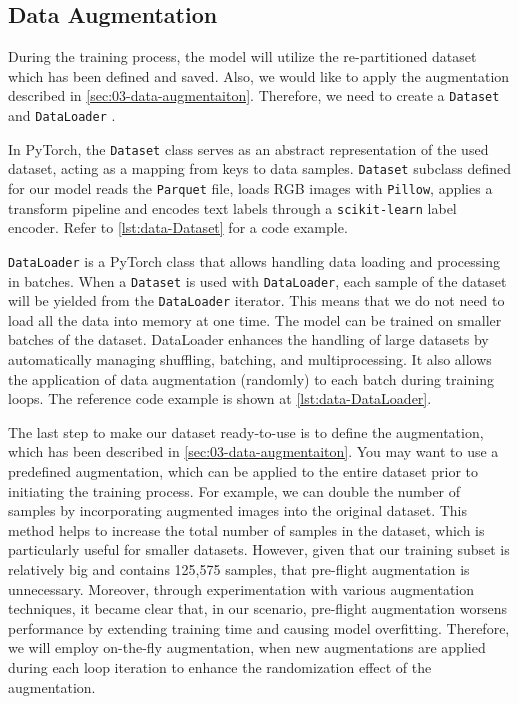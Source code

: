 \subsection*{Data Augmentation}

During the training process, the model will utilize the re-partitioned dataset which has been defined and saved. Also, we would like to apply the augmentation described in \autoref{sec:03-data-augmentaiton}. Therefore, we need to create a \texttt{Dataset} and \texttt{DataLoader} \cite{siddiqui2025mastering}. 

In PyTorch, the \texttt{Dataset} class serves as an abstract representation of the used dataset, acting as a mapping from keys to data samples. \texttt{Dataset} subclass defined for our model reads the \texttt{Parquet} file, loads RGB images with \texttt{Pillow},  applies a transform pipeline and encodes text labels through a \texttt{scikit‑learn} label encoder. Refer to \autoref{lst:data-Dataset} for a code example.

\texttt{DataLoader} is a PyTorch class that allows handling data loading and processing in batches. When a \texttt{Dataset} is used with \texttt{DataLoader}, each sample of the dataset will be yielded from the \texttt{DataLoader} iterator. This means that we do not need to load all the data into memory at one time. The model can be trained on smaller batches of the dataset. DataLoader enhances the handling of large datasets by automatically managing shuffling, batching, and multiprocessing. It also allows the application of data augmentation (randomly) to each batch during training loops. The reference code example is shown at \autoref{lst:data-DataLoader}.

The last step to make our dataset ready-to-use is to define the augmentation, which has been described in \autoref{sec:03-data-augmentaiton}. You may want to use a predefined augmentation, which can be applied to the entire dataset prior to initiating the training process. For example, we can double the number of samples by incorporating augmented images into the original dataset. This method helps to increase the total number of samples in the dataset, which is particularly useful for smaller datasets. However, given that our training subset is relatively big and contains 125,575 samples, that pre-flight augmentation is unnecessary. Moreover, through experimentation with various augmentation techniques, it became clear that, in our scenario, pre-flight augmentation worsens performance by extending training time and causing model overfitting. Therefore, we will employ on-the-fly augmentation, when new augmentations are applied during each loop iteration to enhance the randomization effect of the augmentation.

